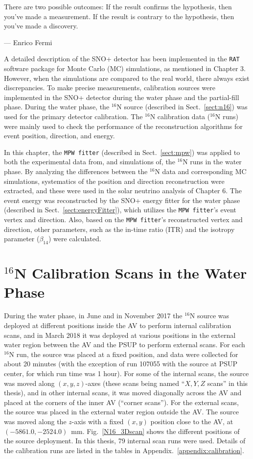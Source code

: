 \epigraph{There are two possible outcomes: If the result confirms the hypothesis, then you've made a measurement. If the result is contrary to the hypothesis, then you've made a discovery.}{---\textup{ Enrico Fermi}}

A detailed description of the SNO+ detector has been implemented in the \texttt{RAT} software package for Monte Carlo (MC) simulations, as mentioned in Chapter 3. However, when the simulations are compared to the real world, there always exist discrepancies. To make precise measurements, calibration sources were implemented in the SNO+ detector during the water phase and the partial-fill phase. During the water phase, the $^{16}$N source (described in Sect.~\ref{sect:n16}) was used for the primary detector calibration. The $^{16}$N calibration data ($^{16}$N runs) were mainly used to check the performance of the reconstruction algorithms for event position, direction, and energy. 

In this chapter, the \texttt{MPW fitter} (described in Sect.~\ref{sect:mpw}) was applied to both the experimental data from, and simulations of, the $^{16}$N runs in the water phase. By analyzing the differences between the $^{16}$N data and corresponding MC simulations, systematics of the position and direction reconstruction were extracted, and these were used in the solar neutrino analysis of Chapter 6. The event energy was reconstructed by the SNO+ energy fitter for the water phase (described in Sect.~\ref{sect:energyFitter}), which utilizes the \texttt{MPW fitter}'s event vertex and direction. Also, based on the \texttt{MPW fitter}'s reconstructed vertex and direction, other parameters, such as the in-time ratio (ITR) and the isotropy parameter ($\beta_{14}$) were calculated.

\section{$^{16}${N} Calibration Scans in the Water Phase}\label{sect:n16_water}

During the water phase, in June and in November 2017 the $^{16}$N source was deployed at different positions inside the AV to perform internal calibration scans, and in March 2018 it was deployed at various positions in the external water region between the AV and the PSUP to perform external scans. For each $^{16}$N run, the source was placed at a fixed position, and data were collected for about 20 minutes (with the exception of run 107055 with the source at PSUP center, for which run time was 1 hour). For some of the internal scans, the source was moved along $(x,y,z)$-axes (these scans being named ``$X, Y, Z$ scans'' in this thesis), and in other internal scans, it was moved diagonally across the AV and placed at the corners of the inner AV (``corner scans''). For the external scans, the source was placed in the external water region outside the AV. The source was moved along the $z$-axis with a fixed $(x,y)$ position close to the AV, at $(-5861.0,-2524.0)$~mm. Fig.~\ref{N16_3Dscan} shows the different positions of the source deployment. In this thesis, 79 internal scan runs were used. Details of the calibration runs are listed in the tables in Appendix.~\ref{appendix:calibration}. %

